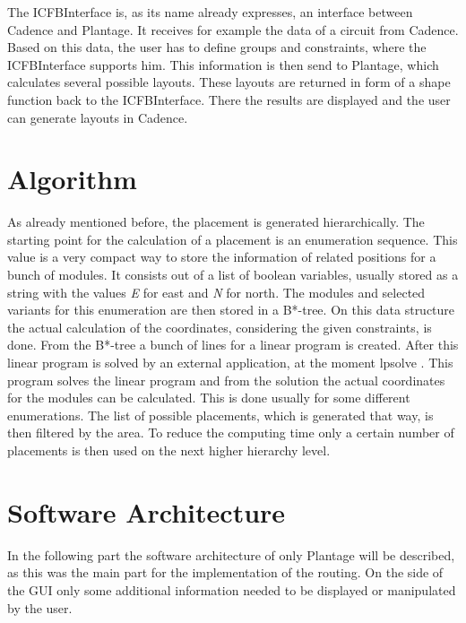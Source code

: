 The ICFBInterface is, as its name already expresses, an interface between Cadence and Plantage. It receives for example the data of a circuit from Cadence. Based on this data, the user has to define groups and constraints, where the ICFBInterface supports him. This information is then send to Plantage, which calculates several possible layouts. These layouts are returned in form of a shape function back to the ICFBInterface. There the results are displayed and the user can generate layouts in Cadence.

\section{Algorithm}
As already mentioned before, the placement is generated hierarchically. The starting point for the calculation of a placement is an enumeration sequence. This value is a very compact way to store the information of related positions for a bunch of modules. It consists out of a list of boolean variables, usually stored as a string with the values \textit{E} for east and \textit{N} for north. The modules and selected variants for this enumeration are then stored in a B*-tree. On this data structure the actual calculation of the coordinates, considering the given constraints, is done. From the B*-tree a bunch of lines for a linear program is created. After this linear program is solved by an external application, at the moment lp\textunderscore solve \cite{lp_solve}. This program solves the linear program and from the solution the actual coordinates for the modules can be calculated. This is done usually for some different enumerations. The list of possible placements, which is generated that way, is then filtered by the area. To reduce the computing time only a certain number of placements is then used on the next higher hierarchy level.

\section{Software Architecture}
In the following part the software architecture of only Plantage will be described, as this was the main part for the implementation of the routing. On the side of the GUI only some additional information needed to be displayed or manipulated by the user.

